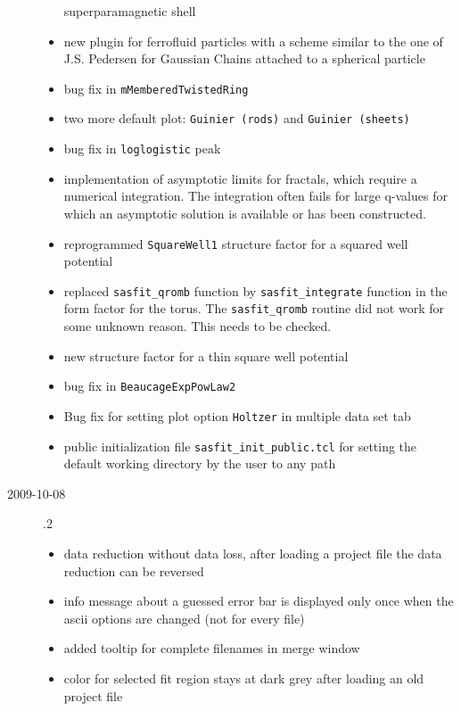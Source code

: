\begin{description}
\begin{itemize}
              superparamagnetic shell
        \item new plugin for ferrofluid particles with a scheme similar to
              the one of J.S. Pedersen for Gaussian Chains attached to a spherical particle
        \item bug fix in \texttt{mMemberedTwistedRing}
        \item two more default plot: \texttt{Guinier (rods)} and \texttt{Guinier (sheets)}
        \item bug fix in \texttt{loglogistic} peak
        \item implementation of asymptotic limits for fractals, which require a
              numerical integration. The integration often fails for large q-values
              for which an asymptotic solution is available or has been constructed.
        \item reprogrammed \texttt{SquareWell1} structure factor for a squared well potential
        \item replaced \texttt{sasfit\_qromb} function by \texttt{sasfit\_integrate} function in the
              form factor for the torus. The \texttt{sasfit\_qromb} routine did not work for some
              unknown reason. This needs to be checked.
        \item new structure factor for a thin square well potential
        \item bug fix in \texttt{BeaucageExpPowLaw2}
        \item Bug fix for setting plot option
              \texttt{Holtzer} in multiple data set tab
        \item public initialization file \texttt{sasfit\_init\_public.tcl} for setting
              the default working directory by the user to any path
        \end{itemize}
    \item[2009-10-08] .2
        \begin{itemize}
          \item data reduction without data loss, after loading a project file the data reduction can be reversed
          \item info message about a guessed error bar is displayed only once when the ascii options are changed
                (not for every file)
          \item added tooltip for complete filenames in merge window
          \item color for selected fit region stays at dark grey after loading an old project file

\end{itemize}
\end{description}
